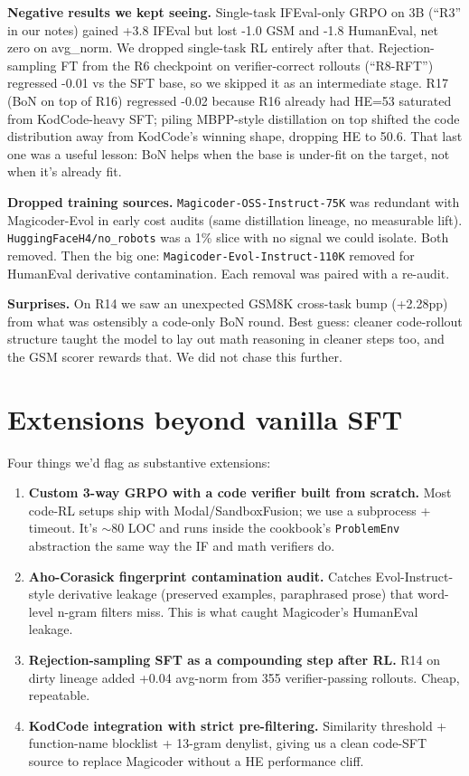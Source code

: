 \documentclass[11pt]{article}
\begin{document}
\textbf{Negative results we kept seeing.} Single-task IFEval-only GRPO on 3B (``R3'' in our notes) gained +3.8 IFEval but lost -1.0 GSM and -1.8 HumanEval, net zero on avg\_norm. We dropped single-task RL entirely after that. Rejection-sampling FT from the R6 checkpoint on verifier-correct rollouts (``R8-RFT'') regressed -0.01 vs the SFT base, so we skipped it as an intermediate stage. R17 (BoN on top of R16) regressed -0.02 because R16 already had HE=53 saturated from KodCode-heavy SFT; piling MBPP-style distillation on top shifted the code distribution away from KodCode's winning shape, dropping HE to 50.6. That last one was a useful lesson: BoN helps when the base is under-fit on the target, not when it's already fit.

\textbf{Dropped training sources.} \texttt{Magicoder-OSS-Instruct-75K} was redundant with Magicoder-Evol in early cost audits (same distillation lineage, no measurable lift). \texttt{HuggingFaceH4/no\_robots} was a 1\% slice with no signal we could isolate. Both removed. Then the big one: \texttt{Magicoder-Evol-Instruct-110K} removed for HumanEval derivative contamination. Each removal was paired with a re-audit.

\textbf{Surprises.} On R14 we saw an unexpected GSM8K cross-task bump (+2.28pp) from what was ostensibly a code-only BoN round. Best guess: cleaner code-rollout structure taught the model to lay out math reasoning in cleaner steps too, and the GSM scorer rewards that. We did not chase this further.

\section{Extensions beyond vanilla SFT}

Four things we'd flag as substantive extensions:
\begin{enumerate}
  \setlength\itemsep{-0.2em}
  \item \textbf{Custom 3-way GRPO with a code verifier built from scratch.} Most code-RL setups ship with Modal/SandboxFusion; we use a subprocess + timeout. It's $\sim$80 LOC and runs inside the cookbook's \texttt{ProblemEnv} abstraction the same way the IF and math verifiers do.
  \item \textbf{Aho-Corasick fingerprint contamination audit.} Catches Evol-Instruct-style derivative leakage (preserved examples, paraphrased prose) that word-level n-gram filters miss. This is what caught Magicoder's HumanEval leakage.
  \item \textbf{Rejection-sampling SFT as a compounding step after RL.} R14 on dirty lineage added +0.04 avg-norm from 355 verifier-passing rollouts. Cheap, repeatable.
  \item \textbf{KodCode integration with strict pre-filtering.} Similarity threshold + function-name blocklist + 13-gram denylist, giving us a clean code-SFT source to replace Magicoder without a HE performance cliff.
\end{enumerate}
\end{document}
